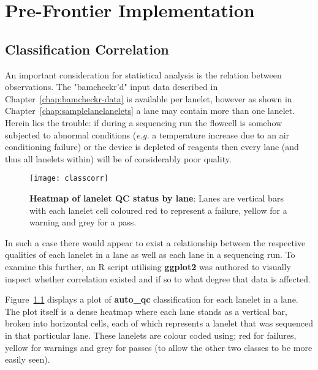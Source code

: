 \chapter{Pre-Frontier Implementation}
\label{app:pre-frontier}

\ifpdf
    \graphicspath{{Chapter2/Figs/Raster/}{Chapter2/Figs/PDF/}{Chapter2/Figs/}}
\else
    \graphicspath{{Chapter2/Figs/Vector/}{Chapter2/Figs/}}
\fi
\section{Classification Correlation}

An important consideration for statistical analysis is the relation between
observations. The "bamcheckr'd" input data described in
Chapter~\ref{chap:bamcheckr-data} is available per lanelet, however as shown in
Chapter~\ref{chap:samplelanelanelets} a lane may contain more than one lanelet.
Herein lies the trouble: if during a sequencing run the flowcell is somehow
subjected to abnormal conditions (\textit{e.g.} a temperature increase due to an air
conditioning failure) or the device is depleted of reagents then every lane (and
thus all lanelets within) will be of considerably poor quality.

\begin{figure}[htbp!]
    \centering
    \texttt{[image: classcorr]}
    \caption[ClassCorr]{\textbf{Heatmap of lanelet QC status by lane}: Lanes are
    vertical bars with each lanelet cell coloured red to represent a failure,
yellow for a warning and grey for a pass.}
    \label{fig:classcorr}
\end{figure}

In such a case there would appear to exist a relationship between the respective
qualities of each lanelet in a lane as well as each lane in a sequencing run. To
examine this further, an R script utilising \textbf{ggplot2} was authored to
visually inspect whether correlation existed and if so to what degree that data
is affected.

Figure~\ref{fig:classcorr} displays a plot of \textbf{auto\_qc} classification
for each lanelet in a lane. The plot itself is a dense heatmap
where each lane stands as a vertical bar, broken into horizontal cells, each
of which represents a lanelet that was sequenced in that particular lane. These
lanelets are colour coded using; red for failures, yellow for warnings and grey
for passes (to allow the other two classes to be more easily seen).

